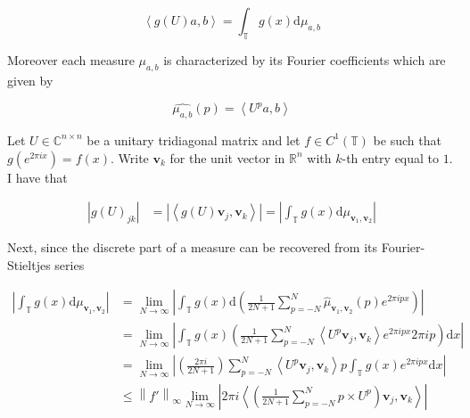 \documentclass{article}
\begin{document}
\begin{equation}
	\left < g \left ( U \right ) a , b \right > = \int_{\mathbb{T}} g \left ( x \right ) \mathrm{d} \mu_{a,b}
\end{equation}

Moreover each measure $\mu_{a,b}$ is characterized by its Fourier coefficients which are given by

\begin{equation}
	\widehat{\mu_{a,b}} \left ( p \right ) = \left < U ^ p a , b \right >
\end{equation} 

Let $U \in \mathbb{C}^{n \times n}$ be a unitary tridiagonal matrix and let $f \in C^1 \left ( \mathbb{T} \right )$ be such that $g \left ( e^{2 \pi i x} \right ) = f (x)$. Write $\mathbf{v}_k$ for the unit vector in $\mathbb{R} ^ n$ with $k$-th entry equal to $1$. I have that

\begin{align}
	\left | g \left ( U \right )_{jk} \right | & = \left | \left < g \left ( U \right ) \mathbf{v}_j, \mathbf{v}_k \right > \right |  = \left | \int_{\mathbb{T}} g \left ( x \right ) \mathrm{d} \mu_{\mathbf{v}_1, \mathbf{v}_2} \right |
\end{align}

Next, since the discrete part of a measure can be recovered from its Fourier-Stieltjes series 

\begin{align}
	\left | \int_{\mathbb{T}} g \left ( x \right ) \mathrm{d} \mu_{\mathbf{v}_1, \mathbf{v}_2} \right | & = \lim_{N \rightarrow \infty} \left | \int_{\mathbb{T}} g (x) \mathrm{d} \left ( \frac{1}{2N + 1} \sum_{p = -N}^N \widehat{\mu}_{\mathbf{v}_1, \mathbf{v}_2} \left ( p \right ) e^{2 \pi i p x} \right ) \right | \\ 
	& = \lim_{N \rightarrow \infty} \left | \int_{\mathbb{T}} g (x) \left ( \frac{1}{2N + 1} \sum_{p = -N}^N \left < U^p \mathbf{v}_j, \mathbf{v}_k \right > e^{2 \pi i p x} 2 \pi i p \right ) \mathrm{d} x \right | \\ 
	& = \lim_{N \rightarrow \infty} \left | \left ( \frac{2 \pi i}{2N + 1} \right ) \sum_{p = - N}^N \left < U^p \mathbf{v}_j, \mathbf{v}_k \right > p \int_{\mathbb{T}} g(x) e^{2 \pi i p x} \mathrm{d} x \right |\\ 
	& \leq \left \| f' \right \|_\infty \lim_{N \rightarrow \infty} \left | 2 \pi i  \left < \left ( \frac{1}{2N + 1} \sum_{p = - N}^N p \times U^p \right ) \mathbf{v}_j, \mathbf{v}_k \right > \right |
\end{align}
\end{document}

